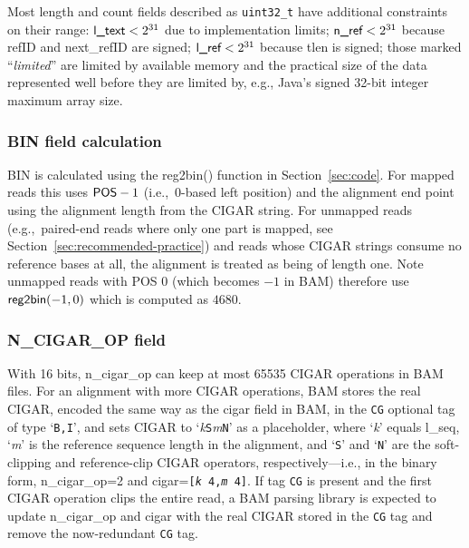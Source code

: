 \documentclass[10pt]{article}
\begin{document}
\noindent
Most length and count fields described as {\tt uint32\_t} have additional constraints on their range:
$\mbox{\sf l\_text} < 2^{31}$ due to implementation limits;
$\mbox{\sf n\_ref} < 2^{31}$ because {\sf refID} and {\sf next\_refID} are signed;
$\mbox{\sf l\_ref} < 2^{31}$ because {\sf tlen} is signed;
those marked ``\textit{limited}'' are limited by available memory and the practical size of the data represented well before they are limited by, e.g., Java's signed 32-bit integer maximum array size.

\subsubsection{BIN field calculation}\label{sec:bin-field}
{\sf BIN} is calculated using the {\sf reg2bin()} function in
Section~\ref{sec:code}.
For mapped reads this uses $\mbox{\sf POS}-1$ (i.e.,~0-based left position) and the
alignment end point using the alignment length from the {\sf CIGAR} string.
For unmapped reads (e.g.,~paired-end reads where only one part is mapped, see
Section~\ref{sec:recommended-practice}) and reads whose {\sf CIGAR} strings
consume no reference bases at all, the alignment is treated as
being of length one.
Note unmapped reads with {\sf POS} $0$ (which becomes $-1$ in BAM) therefore
use $\mbox{\sf reg2bin}(-1, 0)$ which is computed as $4680$.

\subsubsection{N\_CIGAR\_OP field}\label{sec:ncigar}
With 16 bits, {\sf n\_cigar\_op} can keep at most 65535 CIGAR
operations in BAM files. For an alignment with more CIGAR operations, BAM
stores the real {\sf CIGAR}, encoded the same way as the {\sf cigar} field in
BAM, in the {\tt CG} optional tag of type `{\tt B,I}', and sets {\sf CIGAR} to
`\textit{k}{\tt S}\textit{m}{\tt N}' as a placeholder, where `\textit{k}' equals {\sf l\_seq}, `\textit{m}'
is the reference sequence length in the alignment, and `{\tt S}' and `{\tt N}'
are the soft-clipping and reference-clip CIGAR operators, respectively---i.e.,
in the binary form, {\sf n\_cigar\_op}=2 and {\sf cigar}={\tt [\textit{k}
4,\textit{m} 4]}. If tag {\tt CG} is present and
the first CIGAR operation clips the entire read, a BAM parsing library is
expected to update {\sf n\_cigar\_op} and {\sf cigar} with the real CIGAR
stored in the {\tt CG} tag and remove the now-redundant {\tt CG} tag.
\end{document}
